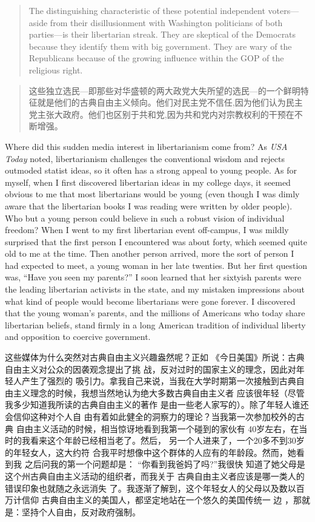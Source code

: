 \begin{paracol}{2}
\switchcolumn*
\begin{quote}
	The distinguishing characteristic of these potential independent voters---aside from their disillusionment with Washington politicians of both parties---is their libertarian streak. They are skeptical of the Democrats because they identify them with big government. They are wary of the Republicans because of the growing influence within the GOP of the religious right.
\end{quote}


\switchcolumn
\begin{quote}
	这些独立选民---即那些对华盛顿的两大政党大失所望的选民---的一个鲜明特征就是他们的古典自由主义倾向。他们对民主党不信任,因为他们认为民主党主张大政府。他们也区别于共和党,因为共和党内对宗教权利的干预在不断增强。
\end{quote}
\switchcolumn*

Where did this sudden media interest in libertarianism
come from? As \textit{USA Today} noted, libertarianism challenges the
conventional wisdom and rejects outmoded statist ideas, so it
often has a strong appeal to young people. As for myself, when
I first discovered libertarian ideas in my college days, it seemed
obvious to me that most libertarians would be young (even
though I was dimly aware that the libertarian books I was
reading were written by older people). Who but a young person could believe in such a robust vision of individual freedom?
When I went to my first libertarian event off-campus, I was
mildly surprised that the first person I encountered was about
forty, which seemed quite old to me at the time. Then another
person arrived, more the sort of person I had expected to meet,
a young woman in her late twenties. But her first question was,
``Have you seen my parents?'' I soon learned that her sixtyish
parents were the leading libertarian activists in the state, and
my mistaken impressions about what kind of people would become libertarians were gone forever. I discovered that the
young woman's parents, and the millions of Americans who
today share libertarian beliefs, stand firmly in a long American
tradition of individual liberty and opposition to coercive government.

\switchcolumn
这些媒体为什么突然对古典自由主义兴趣盎然呢？正如
《今日美国》所说：古典自由主义对公众的因袭观念提出了挑
战，反对过时的国家主义的理念，因此对年轻人产生了强烈的
吸引力。拿我自己来说，当我在大学时期第一次接触到古典自
由主义理念的时候，我想当然地认为绝大多数古典自由主义者
应该很年轻（尽管我多少知道我所读的古典自由主义的著作
是由一些老人家写的）。除了年轻人谁还会信仰这种对个人自
由有着如此健全的洞察力的理论？当我第一次参加校外的古典
自由主义活动的时候，相当惊讶地看到我第一个碰到的家伙有
40岁左右，在当时的我看来这个年龄已经相当老了。然后，
另一个人进来了，一个20多不到30岁的年轻女人，这大约符
合我平时想像中这个群体的人应有的年龄段。然而，她看到我
之后问我的第一个问题却是： “你看到我爸妈了吗?”我很快
知道了她父母是这个州古典自由主义活动的组织者，而我关于
古典自由主义者应该是哪一类人的错误印象也就随之永远消失
了。我逐渐了解到，这个年轻女人的父母以及数以百万计信仰
古典自由主义的美国人，都坚定地站在一个悠久的美国传统一
边 ，那就是：坚持个人自由，反对政府强制。


\end{paracol}
